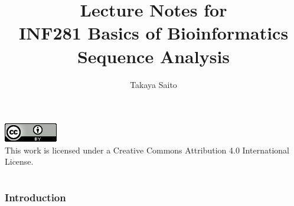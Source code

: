 \documentclass[12pt]{article}
\title{Lecture Notes for \\ INF281 Basics of Bioinformatics Sequence Analysis}
\author{Takaya Saito}
\date{}
\begin{document}
\clearpage\maketitle
\vspace{450px}
\includegraphics[scale=1]{fig00/88x31.png} \\
This work is licensed under a Creative Commons Attribution 4.0 International License.
\thispagestyle{empty}
\pagebreak

\setcounter{page}{1}
\tableofcontents
\pagebreak

\setcounter{page}{1}

\makeatletter 
\renewcommand{\thefigure}{\arabic{section}.\arabic{figure}}
\renewcommand{\thetable}{\arabic{section}.\arabic{table}}
\makeatother

%
%
\part{}

%
%
\setcounter{figure}{0}
\section{Introduction}



\end{document}
